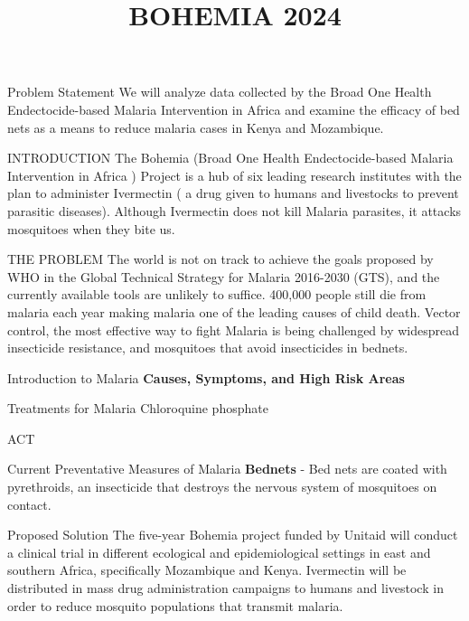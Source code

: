 \documentclass[
  ignorenonframetext,
]{beamer}
\title{BOHEMIA 2024}
\author{}
\date{\vspace{-2.5em}}
\begin{document}
\frame{\titlepage}

\begin{frame}{Problem Statement}
\label{problem-statement}
We will analyze data collected by the Broad One Health Endectocide-based
Malaria Intervention in Africa and examine the efficacy of bed nets as a
means to reduce malaria cases in Kenya and Mozambique.
\end{frame}

\begin{frame}{INTRODUCTION}
\label{introduction}
The Bohemia (Broad One Health Endectocide-based Malaria Intervention in
Africa ) Project is a hub of six leading research institutes with the
plan to administer Ivermectin ( a drug given to humans and livestocks to
prevent parasitic diseases). Although Ivermectin does not kill Malaria
parasites, it attacks mosquitoes when they bite us.
\end{frame}

\begin{frame}{THE PROBLEM}
\label{the-problem}
The world is not on track to achieve the goals proposed by WHO in the
Global Technical Strategy for Malaria 2016-2030 (GTS), and the currently
available tools are unlikely to suffice. 400,000 people still die from
malaria each year making malaria one of the leading causes of child
death. Vector control, the most effective way to fight Malaria is being
challenged by widespread insecticide resistance, and mosquitoes that
avoid insecticides in bednets.
\end{frame}

\begin{frame}{Introduction to Malaria}
\label{introduction-to-malaria}
\textbf{Causes, Symptoms, and High Risk Areas}
\end{frame}

\begin{frame}{Treatments for Malaria}
\label{treatments-for-malaria}
Chloroquine phosphate

ACT
\end{frame}

\begin{frame}{Current Preventative Measures of Malaria}
\label{current-preventative-measures-of-malaria}
\textbf{Bednets} - Bed nets are coated with pyrethroids, an insecticide
that destroys the nervous system of mosquitoes on contact.
\end{frame}

\begin{frame}{Proposed Solution}
\label{proposed-solution}
The five-year Bohemia project funded by Unitaid will conduct a clinical
trial in different ecological and epidemiological settings in east and
southern Africa, specifically Mozambique and Kenya. Ivermectin will be
distributed in mass drug administration campaigns to humans and
livestock in order to reduce mosquito populations that transmit malaria.
\end{frame}
\end{document}
